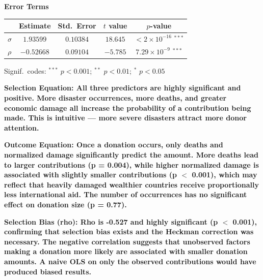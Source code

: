 \documentclass[12pt,letterpaper]{article}
\begin{document}
\begin{table}[htbp]
		\vspace{1em}
		
		\textbf{Error Terms}
		
		\vspace{0.3em}
		\begin{tabular}{lcccc}
			\hline\hline
			& Estimate & Std.\ Error & $t$ value & $p$-value \\
			\hline
			$\sigma$ & $1.93599$ & $0.10384$ & $18.645$ & $< 2\times10^{-16}$ $^{***}$ \\
			$\rho$   & $-0.52668$ & $0.09104$ & $-5.785$ & $7.29\times10^{-9}$ $^{***}$ \\
			\hline\hline
		\end{tabular}
		
		\vspace{0.5em}
		\begin{flushleft}
			\small
			Signif.\ codes: $^{***}$ $p < 0.001$; $^{**}$ $p < 0.01$; $^{*}$ $p < 0.05$
		\end{flushleft}
		
	\end{table}
	
	
	

     \textbf{Selection Equation: All three predictors are highly significant and positive. More disaster occurrences, more deaths, and greater economic damage all increase the probability of a contribution being made. This is intuitive — more severe disasters attract more donor attention.}
     
	\vspace{1cm}
	
	\textbf{Outcome Equation: Once a donation occurs, only deaths and normalized damage significantly predict the amount. More deaths lead to larger contributions (p = 0.004), while higher normalized damage is associated with slightly smaller contributions (p $<$ 0.001), which may reflect that heavily damaged wealthier countries receive proportionally less international aid. The number of occurrences has no significant effect on donation size (p = 0.77).}
	
	\vspace{1cm}
	
	\textbf{Selection Bias (rho): Rho is -0.527 and highly significant (p $<$ 0.001), confirming that selection bias exists and the Heckman correction was necessary. The negative correlation suggests that unobserved factors making a donation more likely are associated with smaller donation amounts. A naive OLS on only the observed contributions would have produced biased results.}
	
\end{document}
